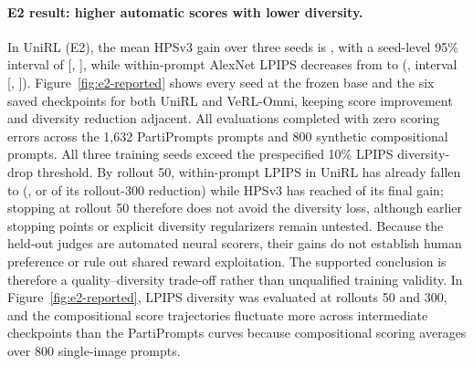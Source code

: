\documentclass[10pt]{article}
\begin{document}
\begin{table}[H]
\caption{E2 (UniRL) and E2-R (VeRL-Omni reference) diffusion endpoints after 300 rollouts, with three training seeds per system. Base and rollout-300 columns are levels, the latter averaged over seeds; changes are absolute score differences unless marked as relative percentages. Intervals are 95\% $t$ intervals over the three seeds, with two degrees of freedom. The LPIPS rows report both absolute within-prompt diversity levels and relative percentage changes.}
\label{tab:rq1}
\centering
\small

\end{table}

\paragraph{E2 result: higher automatic scores with lower diversity.}
In UniRL (E2), the mean HPSv3 gain over three seeds is \ETwoHPSGain{}, with a seed-level 95\% interval of [\ETwoHPSLow{}, \ETwoHPSHigh{}], while within-prompt AlexNet LPIPS decreases from \ETwoLPIPSBase{} to \ETwoLPIPSEndAbs{} (\ETwoDiversityChange{}, interval [\ETwoDiversityLow{}, \ETwoDiversityHigh{}]).
Figure~\ref{fig:e2-reported} shows every seed at the frozen base and the six saved checkpoints for both UniRL and VeRL-Omni, keeping score improvement and diversity reduction adjacent.
All evaluations completed with zero scoring errors across the 1,632 PartiPrompts prompts and 800 synthetic compositional prompts.
All three training seeds exceed the prespecified 10\% LPIPS diversity-drop threshold.
By rollout 50, within-prompt LPIPS in UniRL has already fallen to \ETwoLPIPSEarlyAbs{} (\ETwoDiversityEarly{}, or \ETwoDiversityEarlyShare{} of its rollout-300 reduction) while HPSv3 has reached \ETwoHPSEarlyShare{} of its final gain; stopping at rollout 50 therefore does not avoid the diversity loss, although earlier stopping points or explicit diversity regularizers remain untested.
Because the held-out judges are automated neural scorers, their gains do not establish human preference or rule out shared reward exploitation.
The supported conclusion is therefore a quality--diversity trade-off rather than unqualified training validity.
In Figure~\ref{fig:e2-reported}, LPIPS diversity was evaluated at rollouts 50 and 300, and the compositional score trajectories fluctuate more across intermediate checkpoints than the PartiPrompts curves because compositional scoring averages over 800 single-image prompts.
\end{document}
